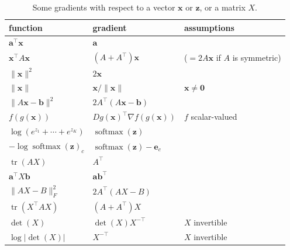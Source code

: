 \documentclass[11pt]{article}
\newcommand{\norm}[1]{\lVert #1 \rVert}
\theoremstyle{definition}
\theoremstyle{plain}
\theoremstyle{remark}
\DeclareMathOperator{\tr}{tr}
\DeclareMathOperator{\softmax}{softmax}
\begin{document}
\begin{table}[ht]
    \centering
    \renewcommand{\arraystretch}{1.35}
    \begin{tabular}{lll}
        \hline
        function & gradient & assumptions \\
        \hline
        $\mathbf{a}^\top \mathbf{x}$ & $\mathbf{a}$ & \\
        $\mathbf{x}^\top A \mathbf{x}$ & $(A + A^\top)\mathbf{x}$ & ($= 2A\mathbf{x}$ if $A$ is symmetric) \\
        $\norm{\mathbf{x}}^2$ & $2\mathbf{x}$ & \\
        $\norm{\mathbf{x}}$ & $\mathbf{x} / \norm{\mathbf{x}}$ & $\mathbf{x} \neq \mathbf{0}$ \\
        $\norm{A\mathbf{x} - \mathbf{b}}^2$ & $2A^\top(A\mathbf{x} - \mathbf{b})$ & \\
        $f(g(\mathbf{x}))$ & $Dg(\mathbf{x})^\top \nabla f(g(\mathbf{x}))$ & $f$ scalar-valued \\
        $\log(e^{z_1} + \cdots + e^{z_K})$ & $\softmax(\mathbf{z})$ & \\
        $-\log \softmax(\mathbf{z})_c$ & $\softmax(\mathbf{z}) - \mathbf{e}_c$ & \\
        $\tr(AX)$ & $A^\top$ & \\
        $\mathbf{a}^\top X \mathbf{b}$ & $\mathbf{a}\mathbf{b}^\top$ & \\
        $\norm{AX - B}_F^2$ & $2A^\top(AX - B)$ & \\
        $\tr(X^\top A X)$ & $(A + A^\top)X$ & \\
        $\det(X)$ & $\det(X)X^{-\top}$ & $X$ invertible \\
        $\log|\det(X)|$ & $X^{-\top}$ & $X$ invertible \\
        \hline
    \end{tabular}
    \caption{Some gradients with respect to a vector $\mathbf{x}$ or $\mathbf{z}$, or a matrix $X$.}
    \label{tab:gradients}
\end{table}
\end{document}

